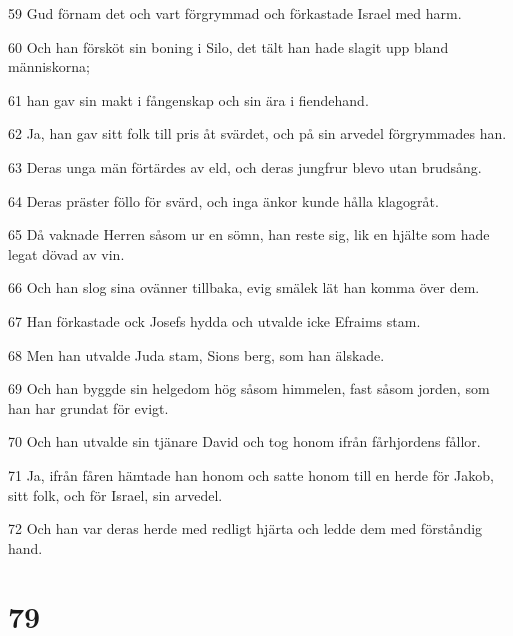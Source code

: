 \par 59 Gud förnam det och vart förgrymmad och förkastade Israel med harm.
\par 60 Och han försköt sin boning i Silo, det tält han hade slagit upp bland människorna;
\par 61 han gav sin makt i fångenskap och sin ära i fiendehand.
\par 62 Ja, han gav sitt folk till pris åt svärdet, och på sin arvedel förgrymmades han.
\par 63 Deras unga män förtärdes av eld, och deras jungfrur blevo utan brudsång.
\par 64 Deras präster föllo för svärd, och inga änkor kunde hålla klagogråt.
\par 65 Då vaknade Herren såsom ur en sömn, han reste sig, lik en hjälte som hade legat dövad av vin.
\par 66 Och han slog sina ovänner tillbaka, evig smälek lät han komma över dem.
\par 67 Han förkastade ock Josefs hydda och utvalde icke Efraims stam.
\par 68 Men han utvalde Juda stam, Sions berg, som han älskade.
\par 69 Och han byggde sin helgedom hög såsom himmelen, fast såsom jorden, som han har grundat för evigt.
\par 70 Och han utvalde sin tjänare David och tog honom ifrån fårhjordens fållor.
\par 71 Ja, ifrån fåren hämtade han honom och satte honom till en herde för Jakob, sitt folk, och för Israel, sin arvedel.
\par 72 Och han var deras herde med redligt hjärta och ledde dem med förståndig hand.

\chapter{79}

